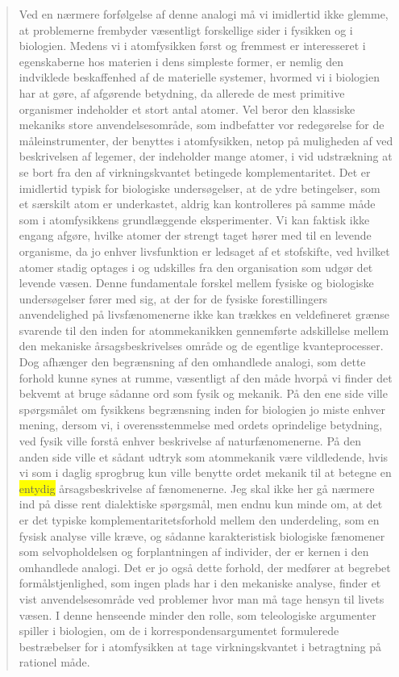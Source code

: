 \documentclass[11pt]{article}
\newcommand{\tlg}[1]{{\setlength{\fboxsep}{0.8pt}\colorbox{yellow}{#1}}}
\begin{document}
\begin{quote}
Ved en nærmere forfølgelse af denne analogi må vi imidlertid ikke glemme, at problemerne frembyder væsentligt forskellige sider i fysikken og i biologien. Medens vi i atomfysikken først og fremmest er interesseret i egenskaberne hos materien i dens simpleste former, er nemlig den indviklede beskaffenhed af de materielle systemer, hvormed vi i biologien har at gøre, af afgørende betydning, da allerede de mest primitive organismer indeholder et stort antal atomer. Vel beror den klassiske mekaniks store anvendelsesområde, som indbefatter vor redegørelse for de måleinstrumenter, der benyttes i atomfysikken, netop på muligheden af ved beskrivelsen af legemer, der indeholder mange atomer, i vid udstrækning at se bort fra den af virkningskvantet betingede komplementaritet. Det er imidlertid typisk for biologiske undersøgelser, at de ydre betingelser, som et særskilt atom er underkastet, aldrig kan kontrolleres på samme måde som i atomfysikkens grundlæggende eksperimenter. Vi kan faktisk ikke engang afgøre, hvilke atomer der strengt taget hører med til en levende organisme, da jo enhver livsfunktion er ledsaget af et stofskifte, ved hvilket atomer stadig optages i og udskilles fra den organisation som udgør det levende væsen. Denne fundamentale forskel mellem fysiske og biologiske undersøgelser fører med sig, at der for de fysiske forestillingers anvendelighed på livsfænomenerne ikke kan trækkes en veldefineret grænse svarende til den inden for atommekanikken gennemførte adskillelse mellem den mekaniske årsagsbeskrivelses område og de egentlige kvanteprocesser. Dog afhænger den begrænsning af den omhandlede analogi, som dette forhold kunne synes at rumme, væsentligt af den måde hvorpå vi finder det bekvemt at bruge sådanne ord som fysik og mekanik. På den ene side ville spørgsmålet om fysikkens begrænsning inden for biologien jo miste enhver mening, dersom vi, i overensstemmelse med ordets oprindelige betydning, ved fysik ville forstå enhver beskrivelse af naturfænomenerne. På den anden side ville et sådant udtryk som atommekanik være vildledende, hvis vi som i daglig sprogbrug kun ville benytte ordet mekanik til at betegne en \tlg{entydig} årsagsbeskrivelse af fænomenerne. Jeg skal ikke her gå nærmere ind på disse rent dialektiske spørgsmål, men endnu kun minde om, at det er det typiske komplementaritetsforhold mellem den underdeling, som en fysisk analyse ville kræve, og sådanne karakteristisk biologiske fænomener som selvopholdelsen og forplantningen af individer, der er kernen i den omhandlede analogi. Det er jo også dette forhold, der medfører at begrebet formålstjenlighed, som ingen plads har i den mekaniske analyse, finder et vist anvendelsesområde ved problemer hvor man må tage hensyn til livets væsen. I denne henseende minder den rolle, som teleologiske argumenter spiller i biologien, om de i korrespondensargumentet formulerede bestræbelser for i atomfysikken at tage virkningskvantet i betragtning på rationel måde.
\end{quote}
\end{document}
